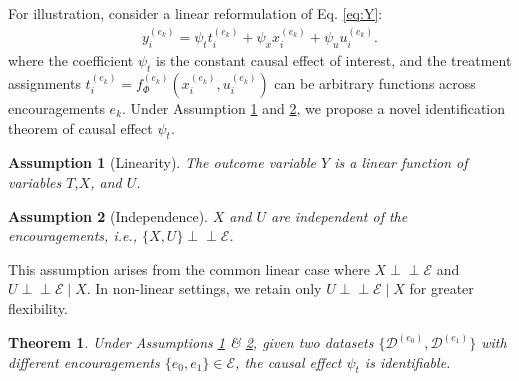 \documentclass[journal]{IEEEtran}
\newtheorem{theorem}{Theorem}
\newtheorem{assumption}{Assumption}
\newcommand{\indep}{\perp \!\!\! \perp}
\begin{document}
For illustration, consider a linear reformulation of Eq. \eqref{eq:Y}:
\begin{eqnarray}
    y_i^{(e_k)} = \psi_t t_i^{(e_k)} + \psi_x x_i^{(e_k)} +\psi_u u_i^{(e_k)}.
    \label{eq:linearY}
\end{eqnarray}
where the coefficient $\psi_t$ is the constant causal effect of interest, and the treatment assignments $t_i^{(e_k)} = f^{(e_k)}_{\Phi}(x_i^{(e_k)}, u_i^{(e_k)})$ can be arbitrary functions across encouragements $e_k$.
Under Assumption \ref{ass:linear} and \ref{ass:indep}, we propose a novel identification theorem of causal effect $\psi_t$. 

\begin{assumption}[Linearity] \label{ass:linear}
The outcome variable $Y$ is a linear function of variables $T$,$X$, and $U$.
\end{assumption}

\begin{assumption}[Independence] \label{ass:indep}
    $X$ and $U$ are independent of the encouragements, i.e., $\{X, U\} \indep \mathcal{E}$.
\end{assumption}

This assumption arises from the common linear case where $X \indep \mathcal{E}$ and $U \indep \mathcal{E} \mid X$. In non-linear settings, we retain only $U \indep \mathcal{E} \mid X$ for greater flexibility.

\begin{theorem}
    \label{theorem:1}
    Under Assumptions \ref{ass:linear} \& \ref{ass:indep}, given two datasets $\{ \mathcal{D}^{(e_0)}, \mathcal{D}^{(e_1)}\}$ with different encouragements $\{e_0,e_1\} \in \mathcal{E}$, the causal effect $\psi_t$ is identifiable. 
\end{theorem}
\end{document}
